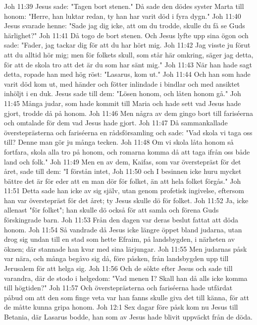 Joh 11:39  Jesus sade: "Tagen bort stenen." Då sade den dödes syster Marta till honom: "Herre, han luktar redan, ty han har varit död i fyra dygn."
Joh 11:40  Jesus svarade henne: "Sade jag dig icke, att om du trodde, skulle du få se Guds härlighet?"
Joh 11:41  Då togo de bort stenen. Och Jesus lyfte upp sina ögon och sade: "Fader, jag tackar dig för att du har hört mig.
Joh 11:42  Jag visste ju förut att du alltid hör mig; men för folkets skull, som står här omkring, säger jag detta, för att de skola tro att det är du som har sänt mig."
Joh 11:43  När han hade sagt detta, ropade han med hög röst: "Lasarus, kom ut."
Joh 11:44  Och han som hade varit död kom ut, med händer och fötter inlindade i bindlar och med ansiktet inhöljt i en duk. Jesus sade till dem: "Lösen honom, och låten honom gå."
Joh 11:45  Många judar, som hade kommit till Maria och hade sett vad Jesus hade gjort, trodde då på honom.
Joh 11:46  Men några av dem gingo bort till fariséerna och omtalade för dem vad Jesus hade gjort.
Joh 11:47  Då sammankallade översteprästerna och fariséerna en rådsförsamling och sade: "Vad skola vi taga oss till? Denne man gör ju många tecken.
Joh 11:48  Om vi skola låta honom så fortfara, skola alla tro på honom, och romarna komma då att taga ifrån oss både land och folk."
Joh 11:49  Men en av dem, Kaifas, som var överstepräst för det året, sade till dem: "I förstån intet,
Joh 11:50  och I besinnen icke huru mycket bättre det är för eder att en man dör för folket, än att hela folket förgås."
Joh 11:51  Detta sade han icke av sig själv, utan genom profetisk ingivelse, eftersom han var överstepräst för det året; ty Jesus skulle dö för folket.
Joh 11:52  Ja, icke allenast "för folket"; han skulle dö också för att samla och förena Guds förskingrade barn.
Joh 11:53  Från den dagen var deras beslut fattat att döda honom.
Joh 11:54  Så vandrade då Jesus icke längre öppet bland judarna, utan drog sig undan till en stad som hette Efraim, på landsbygden, i närheten av öknen; där stannade han kvar med sina lärjungar.
Joh 11:55  Men judarnas påsk var nära, och många begåvo sig då, före påsken, från landsbygden upp till Jerusalem för att helga sig.
Joh 11:56  Och de sökte efter Jesus och sade till varandra, där de stodo i helgedom: "Vad menen I? Skall han då alls icke komma till högtiden?"
Joh 11:57  Och översteprästerna och fariséerna hade utfärdat påbud om att den som finge veta var han fanns skulle giva det till känna, för att de måtte kunna gripa honom.
Joh 12:1  Sex dagar före påsk kom nu Jesus till Betania, där Lasarus bodde, han som av Jesus hade blivit uppväckt från de döda.
